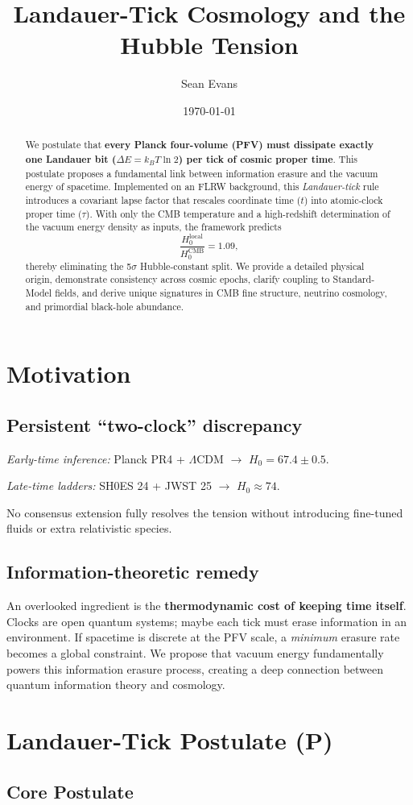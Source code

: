 \documentclass[12pt,a4paper]{article}
\title{Landauer-Tick Cosmology and the Hubble Tension}
\author{Sean Evans}
\date{\today}
\newcommand{\sect}[1]{\section{#1}}
\newcommand{\subsect}[1]{\subsection{#1}}
\begin{document}
\maketitle

\begin{abstract}
We postulate that \textbf{every Planck four-volume (PFV) must dissipate exactly one Landauer bit ($\Delta E = k_B T \ln 2$) per tick of cosmic proper time}. This postulate proposes a fundamental link between information erasure and the vacuum energy of spacetime. Implemented on an FLRW background, this \textit{Landauer-tick} rule introduces a covariant lapse factor that rescales coordinate time ($t$) into atomic-clock proper time ($\tau$). With only the CMB temperature and a high-redshift determination of the vacuum energy density as inputs, the framework predicts
\begin{equation}
\frac{H_{0}^{\text{local}}}{H_{0}^{\text{CMB}}} = 1.09,
\end{equation}
thereby eliminating the 5$\sigma$ Hubble-constant split. We provide a detailed physical origin, demonstrate consistency across cosmic epochs, clarify coupling to Standard-Model fields, and derive unique signatures in CMB fine structure, neutrino cosmology, and primordial black-hole abundance.
\end{abstract}

\sect{Motivation}

\subsect{Persistent ``two-clock'' discrepancy}

\textit{Early-time inference:} Planck PR4 + $\Lambda$CDM $\rightarrow$ $H_0=67.4\pm0.5$.

\textit{Late-time ladders:} SH0ES 24 + JWST 25 $\rightarrow$ $H_0 \approx 74$.

No consensus extension fully resolves the tension without introducing fine-tuned fluids or extra relativistic species.

\subsect{Information-theoretic remedy}

An overlooked ingredient is the \textbf{thermodynamic cost of keeping time itself}. Clocks are open quantum systems; maybe each tick must erase information in an environment. If spacetime is discrete at the PFV scale, a \textit{minimum} erasure rate becomes a global constraint. We propose that vacuum energy fundamentally powers this information erasure process, creating a deep connection between quantum information theory and cosmology.

\sect{Landauer-Tick Postulate (P)}

\subsect{Core Postulate}
\end{document}
